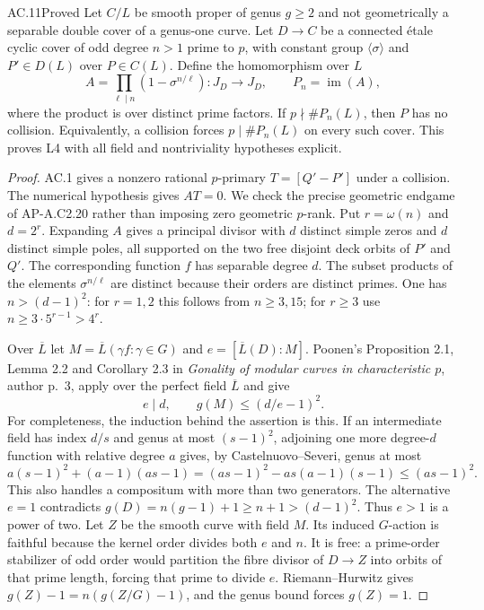 \begin{claim}{AC.11}{Proved}
Let $C/L$ be smooth proper of genus $g\ge2$ and not geometrically a
separable double cover of a genus-one curve.  Let $D\to C$ be a
connected \'etale cyclic cover of odd degree $n>1$ prime to $p$, with
constant group $\langle\sigma\rangle$ and $P'\in D(L)$ over
$P\in C(L)$.  Define the homomorphism over $L$
\[
       A=\prod_{\ell\mid n}(1-\sigma^{n/\ell}):J_D\to J_D,
       \qquad P_n=\operatorname{im}(A),
\]
where the product is over distinct prime factors.  If
$p\nmid\#P_n(L)$, then $P$ has no collision.  Equivalently, a collision
forces $p\mid\#P_n(L)$ on every such cover.  This proves L4 with all
field and nontriviality hypotheses explicit.
\end{claim}
\begin{proof}
AC.1 gives a nonzero rational $p$-primary $T=[Q'-P']$ under a collision.
The numerical hypothesis gives $A T=0$.  We check the precise geometric
endgame of AP-A.C2.20 rather than imposing zero geometric $p$-rank.
Put $r=\omega(n)$ and $d=2^r$.  Expanding $A$ gives a principal divisor
with $d$ distinct simple zeros and $d$ distinct simple poles, all supported
on the two free disjoint deck orbits of $P'$ and $Q'$.  The corresponding
function $f$ has separable degree $d$.  The subset products of the elements
$\sigma^{n/\ell}$ are distinct because their orders are distinct primes.
One has $n>(d-1)^2$: for $r=1,2$ this follows from $n\ge3,15$; for
$r\ge3$ use $n\ge3\cdot5^{r-1}>4^r$.

Over $\overline L$ let $M=\overline L(\gamma f:\gamma\in G)$ and
$e=[\overline L(D):M]$.  Poonen's Proposition 2.1, Lemma 2.2 and
Corollary 2.3 in \emph{Gonality of modular curves in characteristic $p$},
author p.~3, apply over the perfect field $\overline L$ and give
\cite{AC_Poonen2007}
\[
                     e\mid d,\qquad g(M)\le(d/e-1)^2.
\]
For completeness, the induction behind the assertion is this.  If an
intermediate field has index $d/s$ and genus at most $(s-1)^2$, adjoining
one more degree-$d$ function with relative degree $a$ gives, by
Castelnuovo--Severi, genus at most
\[
        a(s-1)^2+(a-1)(as-1)
          =(as-1)^2-as(a-1)(s-1)\le(as-1)^2.
\]
This also handles a compositum with more than two generators.
The alternative $e=1$ contradicts
$g(D)=n(g-1)+1\ge n+1>(d-1)^2$.  Thus $e>1$ is a power of two.
Let $Z$ be the smooth curve with field $M$.  Its induced $G$-action is
faithful because the kernel order divides both $e$ and $n$.  It is free:
a prime-order stabilizer of odd order would partition the fibre divisor
of $D\to Z$ into orbits of that prime length, forcing that prime to divide
$e$.  Riemann--Hurwitz gives
$g(Z)-1=n(g(Z/G)-1)$, and the genus bound forces $g(Z)=1$.


\end{proof}
